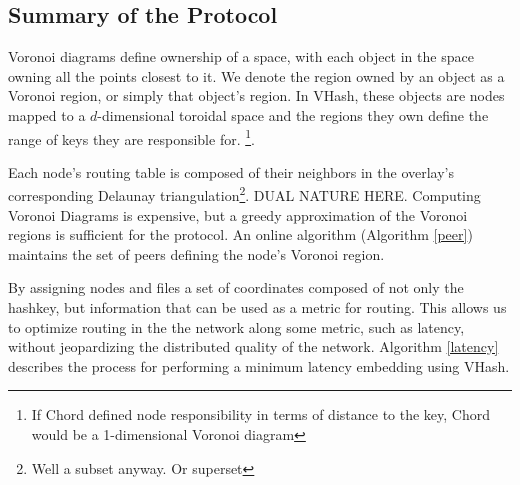 \documentclass{IEEEtran}
\begin{document}
 







\subsection{Summary of the Protocol}
Voronoi diagrams define ownership of a space, with each object in the space owning all the points closest to it.  We denote the region owned by an object as a Voronoi region, or simply that object's region.  In VHash, these objects are nodes mapped to a $d$-dimensional toroidal space and the regions they own define the range of keys they are responsible for.  \footnote{If Chord defined node responsibility in terms of distance to the key, Chord would be a 1-dimensional Voronoi diagram}.  


Each node's routing table is composed of their neighbors in the overlay's corresponding Delaunay triangulation\footnote{Well a subset anyway. Or superset}.  DUAL NATURE HERE.  Computing Voronoi Diagrams is expensive, but a greedy approximation of the Voronoi regions is sufficient for the protocol.  An online algorithm (Algorithm \ref{peer}) maintains the set of peers defining the node's Voronoi region.


By assigning nodes and files a set of coordinates composed of not only the hashkey, but information that can be used as a metric for routing.  This allows us to optimize routing in the the network along some metric, such as latency, without jeopardizing the distributed quality of the network.  Algorithm \ref{latency} describes the process for performing a minimum latency embedding using VHash.
\end{document}
